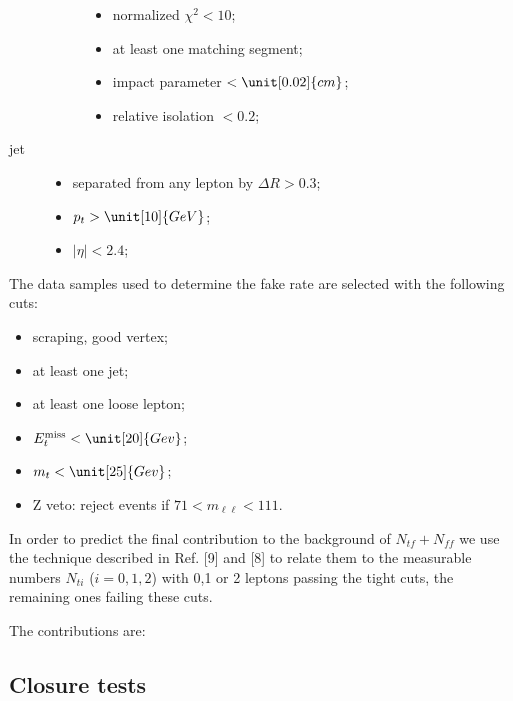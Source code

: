 \begin{description}
\begin{description}
\begin{itemize}
                    \item normalized $\chi^2 < 10$;
                    \item at least one matching segment;
                    \item impact parameter $< \unit[0.02]{cm}$;
                    \item relative isolation $< 0.2$;
                \end{itemize}
        \end{description}
    \item[jet] 
        \begin{itemize}
            \item separated from any lepton by $\Delta R > 0.3$;
            \item $p_t > \unit[10]{GeV}$;
            \item $\lvert \eta \rvert < 2.4$;
        \end{itemize}
\end{description}

The data samples used to determine the fake rate are selected with the following cuts:
\begin{itemize}
    \item scraping, good vertex;
    \item at least one jet;
    \item at least one loose lepton;
    \item $E_t^{\text{miss}} < \unit[20]{Gev}$;
    \item $m_t < \unit[25]{Gev}$;
    \item $\mathrm{Z}$ veto: reject events if $71 < m_{\ell \ell} < 111$.
\end{itemize}

In order to predict the final contribution to the background of
$N_{tf} + N_{ff}$ we use the technique described in
Ref. [9] and [8] to relate them to the measurable numbers $N_{ti}$
($i = 0,1,2$) with 0,1 or 2 leptons passing the tight cuts, the remaining
ones failing these cuts.

The contributions are:

    
\subsection{Closure tests}
